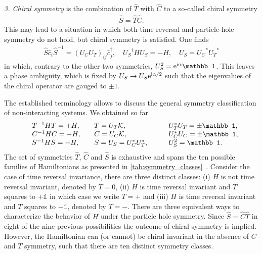{\it 3. Chiral symmetry} is the combination of $\hat T$ with $\hat C$ to a so-called chiral symmetry
\begin{align}
    \hat S = \hat T \hat C.
\end{align}
This may lead to a situation in which both time reversal and particle-hole symmetry do not hold, but chiral symmetry is satisfied.
One finds
\begin{align}
    \hat S \hat c_i \hat S^{-1} = (U_CU_T)_{ij}\hat c^\dag_j
    ,\quad
    {U_S}^\dag H {U_S} = -H
    ,\quad
    {U_S} = {U_C}^* {U_T}^*
\end{align}
in which, contrary to the other two symmetries, $U_S^2=\re^{\ri\alpha}\mathbb1$.
This leaves a phase ambiguity, which is fixed by $U_S\rightarrow U_S\mathrm e^{\mathrm i\alpha/2}$ such that the eigenvalues of the chiral operator are gauged to $\pm1$.

The established terminology allows to discuss the general symmetry classification of non-interacting systems.
We obtained so far
\begin{align}
    \begin{array}{l l l l }
        & T^{-1}HT = +H
        ,\quad
        & T = U_T\mathcal K
        ,\quad
        & U_T^*U_T = \pm\mathbb1,\\
        & C^{-1}HC = -H
        ,\quad
        & C = U_C\mathcal K
        ,\quad
        & U_C^*U_C = \pm\mathbb1,\\
        & S^{-1}HS = -H
        ,\quad
        & S = U_S = U_C^* U^*_T
        ,\qquad
        & U_S^2 = \mathbb1.
    \end{array}
    \label{eq:symmetry_real_space}
\end{align}
The set of symmetries $\hat T$, $\hat C$ and $\hat S$ is exhaustive and spans the ten possible families of Hamiltonians as presented in \cref{tab:symmetry_classes}~\cite{Chiu2016}.
Consider the case of time reversal invariance, there are three distinct classes:
(i) $H$ is not time reversal invariant, denoted by $T=0$, (ii) $H$ is time reversal invariant and $T$ squares to $+\mathbb1$ in which case we write $T=+$ and (iii) $H$ is time reversal invariant and $T$ squares to $-\mathbb1$, denoted by $T=-$.
There are three equivalent ways to characterize the behavior of $H$ under the particle hole symmetry.
Since $\hat S = \hat C\hat T$ in eight of the nine previous possibilities the outcome of chiral symmetry is implied.
However, the Hamiltonian can (or cannot) be chiral invariant in the absence of $C$ and $T$ symmetry, such that there are ten distinct symmetry classes.

